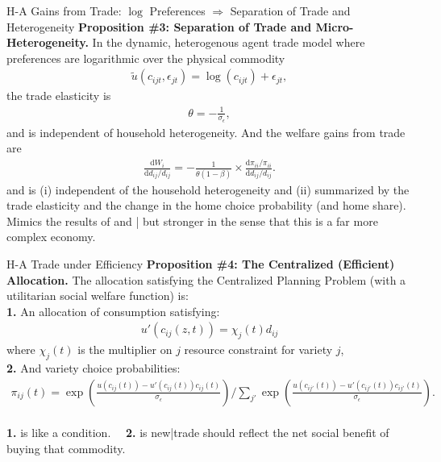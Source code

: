\documentclass[9pt,pdftex,aspectratio=1610]{beamer}
\theoremstyle{definition}
\begin{document}
\begin{frame}[t]{H-A Gains from Trade: $\log$ Preferences $\Rightarrow$ Separation of Trade and Heterogeneity}
\smallskip
\textbf{Proposition \#3: Separation of Trade and Micro-Heterogeneity.} In the dynamic, heterogenous agent trade model where preferences are logarithmic over the physical commodity
\begin{align}
\tilde{u}( c_{ijt}, \epsilon_{jt} ) =  \log(c_{ijt}) + \epsilon_{jt}, \nonumber
\end{align}
the trade elasticity is
\begin{align}
\theta = -\frac{1}{\sigma_{\epsilon}}, \nonumber
\end{align}
and is independent of household heterogeneity. And the welfare gains from trade are
\begin{align}
\frac{\mathrm{d} W_{i}}{\mathrm{d} d_{ij} / d_{ij}} = -\frac{1}{\theta (1-\beta)} \times \frac{\mathrm{d} \pi_{ii} / \pi_{ii}}{\mathrm{d}d_{ij} / d_{ij}}. \nonumber
\end{align}
and is (i) independent of the household heterogeneity and (ii) summarized by the trade elasticity and the change in the home choice probability (and home share).\\
\bigskip
\medskip
Mimics the results of \citet{anderson1987ces} and \citet{arkolakis2012new}| but stronger in the sense that this is a far more complex economy.
\end{frame}


\begin{frame}[t]{H-A Trade under Efficiency}
\smallskip
\textbf{Proposition \#4: The Centralized (Efficient) Allocation.} The allocation satisfying the Centralized Planning Problem (with a utilitarian social welfare function) is:\\
\bigskip
\textbf{1.} An allocation of consumption satisfying:
\begin{align}
u'(c_{ij}(z,t) ) = \chi_{j}(t) d_{ij} \nonumber
\end{align}
where $\chi_{j}(t)$ is the multiplier on $j$ resource constraint for variety $j$,\\
\bigskip
\medskip
\textbf{2.} And variety choice probabilities:
\begin{align}
\displaystyle \pi_{ij}(t) =\exp \left( \frac{u(c_{ij}(t)) - u'(c_{ij}(t))c_{ij}(t)}{\sigma_{\epsilon}}\right) \bigg / \sum_{j'}\exp \left( \frac{u(c_{ij'}(t)) - u'(c_{ij'}(t))c_{ij'}(t)}{\sigma_{\epsilon}} \right). \nonumber
\end{align}\\
\bigskip
\medskip
\textbf{1.} is like a \citet{backus1993} condition. \ \ \textbf{2.} is new|trade should reflect the net social benefit of buying that commodity.
\end{frame}
\end{document}
